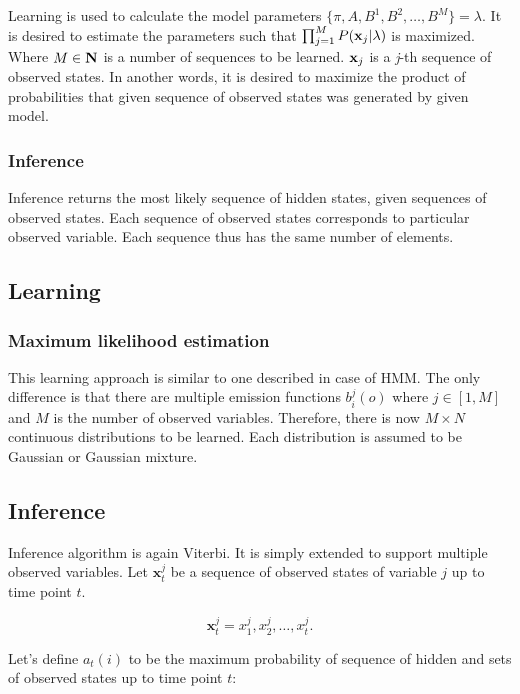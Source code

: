 \documentclass[thesis=B,english]{FITthesis}[2012/06/26]
\begin{document}
Learning is used to calculate the model parameters $\{\pi,A,B^1,B^2,\dots,B^M\} = \lambda$. It is desired to estimate the parameters such that $\prod_{j=1}^{M} P(\textbf x_j | \lambda )$ is maximized. Where $M \in \textbf N$ is a number of sequences to be learned. $\textbf x_j$ is a \emph{j}-th sequence of observed states. In another words, it is desired to maximize the product of probabilities that given sequence of observed states was generated by given model.

\subsubsection{Inference}

Inference returns the most likely sequence of hidden states, given sequences of observed states. Each sequence of observed states corresponds to particular observed variable. Each sequence thus has the same number of elements.

\subsection{Learning}

\subsubsection{Maximum likelihood estimation}

This learning approach is similar to one described in case of HMM. The only difference is that there are multiple emission functions $b^j_i(o)$ where $j \in [1,M]$ and $M$ is the number of observed variables. Therefore, there is now $M \times N$ continuous distributions to be learned. Each distribution is assumed to be Gaussian or Gaussian mixture.

\subsection{Inference}

Inference algorithm is again Viterbi. It is simply extended to support multiple observed variables. Let $\textbf{x}_t^j$ be a sequence of observed states of variable $j$ up to time point $t$.

\begin{equation}
\textbf{x}_t^j = x_1^j,x_2^j,\dots,x_t^j.
\end{equation}

Let's define $a_t(i)$ to be the maximum probability of sequence of hidden and sets of observed states up to time point $t$:
\end{document}

